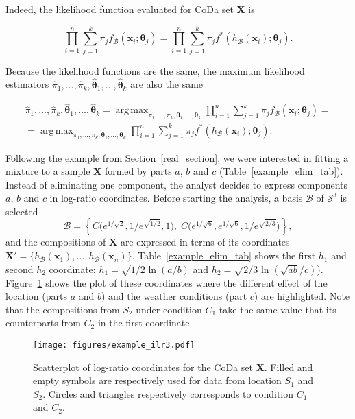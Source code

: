 \documentclass[12pt, a4paper]{article}
\newcommand{\m}[1]{\boldsymbol{#1}}
\DeclareMathOperator*{\argmax}{arg\,max}
\begin{document}
Indeed, the likelihood function evaluated for CoDa set $\mathbf{X}$ is

\begin{equation}\label{likeli1}
\prod_{i=1}^n \sum_{j=1}^k \pi_j f_\mathcal{B}(\textbf{x}_i; \m\theta_j)=\prod_{i=1}^n \sum_{j=1}^k \pi_j f^*(h_\mathcal{B}(\textbf{x}_i); \m\theta_j).
\end{equation}

Because the likelihood functions are the same,  the maximum likelihood estimators $\hat{\pi}_1, \dots, \hat{\pi}_k, \hat{\m\theta}_1, \dots, \hat{\m\theta}_k$ are also the same

\begin{eqnarray}
\hat{\pi}_1, \dots, \hat{\pi}_k, \hat{\m\theta}_1, \dots, \hat{\m\theta}_k = \argmax_{\pi_1, \dots, \pi_k, \m\theta_1, \dots, \m\theta_k} \prod_{i=1}^n \sum_{j=1}^k \pi_j f_\mathcal{B}(\textbf{x}_i; \m\theta_j) = \\ 
= \argmax_{\pi_1, \dots, \pi_k, \m\theta_1, \dots, \m\theta_k} \prod_{i=1}^n \sum_{j=1}^k \pi_j f^*(h_\mathcal{B}(\textbf{x}_i); \m\theta_j).
\end{eqnarray}


Following the example from Section~\ref{real_section}, we were interested in fitting a mixture to a sample $\mathbf{X}$ formed by parts $a$, $b$ and $c$ (Table~\ref{example_elim_tab}). Instead of eliminating one component, the analyst decides to express components $a$, $b$ and $c$ in log-ratio coordinates. Before starting the analysis, a basis $\mathcal{B}$ of $\mathcal{S}^3$ is selected
\begin{equation}
\mathcal{B} = \left\{ C\Big( e^{1/\sqrt{2}}, 1/e^{\sqrt{1/2}}, 1 \Big), \; C\Big( e^{1/\sqrt{6}}, e^{1/\sqrt{6}}, 1/e^{\sqrt{2/3}} \Big) \right\},
\end{equation}
and the compositions of $\mathbf{X}$ are expressed in terms of its coordinates 
$\mathbf{X}' = \{h_{\mathcal{B}}(\textbf{x}_1), \dots, h_{\mathcal{B}}(\textbf{x}_n)\}$. Table~\ref{example_elim_tab} shows the first $h_1$ and second $h_2$ coordinate: $h_1 = \sqrt{1/2} \ln(a/b)$ and $h_2 = \sqrt{2/3} \ln(\sqrt{ab} / c)$). Figure~\ref{example_ilr3} shows the plot of these coordinates where the different effect of the location (parts $a$ and $b$) and the weather conditions (part $c$) are highlighted. Note that the compositions from $S_2$ under condition $C_1$ take the same value that its counterparts from $C_2$ in the first coordinate. 



\begin{figure}[thbp]
\centering
\texttt{[image: figures/example\_ilr3.pdf]}
\caption{Scatterplot of log-ratio coordinates for the CoDa set $\mathbf{X}$. Filled and empty symbols are respectively used for data from location $S_1$ and $S_2$. Circles and triangles respectively corresponds to condition $C_1$ and $C_2$.}\label{example_ilr3}
\end{figure}
\end{document}
